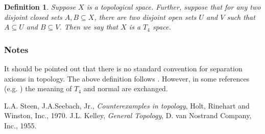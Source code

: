 \documentclass[12pt]{article}
\newtheorem{defn}{Definition}
\begin{document}
\begin{defn} \cite{steen}
Suppose $X$ is a topological space. Further, suppose that
for any two disjoint 
closed sets $A,B\subseteq X$, there are two disjoint open sets 
$U$ and $V$ such that $A\subseteq U$ and $B\subseteq V$. Then we say 
that $X$ is a \emph{$T_4$ space}.
\end{defn}
                        
\subsubsection*{Notes}
It should be pointed out that  there is no standard convention
for separation axioms in topology. The above definition follows
\cite{steen}. However, in some references (e.g. \cite{kelley})
the meaning of $T_4$ and normal are exchanged.                                                     
                                                                                
\begin{thebibliography}{9}
 L.A. Steen, J.A.Seebach, Jr.,
\emph{Counterexamples in topology},
Holt, Rinehart and Winston, Inc., 1970.
J.L. Kelley, \emph{General Topology}, D. van Nostrand Company, Inc., 1955.
\end{thebibliography}
\end{document}
